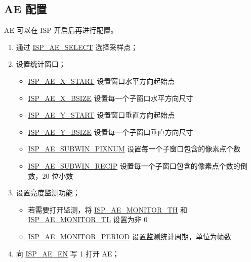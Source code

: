 \documentclass[main\_\_CN.tex]{subfiles}
\begin{document}
\subsection{AE 配置}
AE 可以在 ISP 开启后再进行配置。
\begin{enumerate}
    \item 通过 \hyperref[fielddesc:ISPAESELECT]{ISP\_AE\_SELECT} 选择采样点；

    \item 设置统计窗口；
    \begin{itemize}
        \item \hyperref[fielddesc:ISPAEXSTART]{ISP\_AE\_X\_START} 设置窗口水平方向起始点
        \item \hyperref[fielddesc:ISPAEXBSIZE]{ISP\_AE\_X\_BSIZE} 设置每一个子窗口水平方向尺寸
        \item \hyperref[fielddesc:ISPAEYSTART]{ISP\_AE\_Y\_START} 设置窗口垂直方向起始点
        \item \hyperref[fielddesc:ISPAEYBSIZE]{ISP\_AE\_Y\_BSIZE} 设置每一个子窗口垂直方向尺寸
        \item \hyperref[fielddesc:ISPAESUBWINPIXNUM]{ISP\_AE\_SUBWIN\_PIXNUM} 设置每一个子窗口包含的像素点个数
        \item \hyperref[fielddesc:ISPAESUBWINRECIP]{ISP\_AE\_SUBWIN\_RECIP} 设置每一个子窗口包含的像素点个数的倒数，20 位小数
    \end{itemize}

    \item 设置亮度监测功能；
    \begin{itemize}
        \item 若需要打开监测，将 \hyperref[fielddesc:ISPAEMONITORTH]{ISP\_AE\_MONITOR\_TH} 和 \hyperref[fielddesc:ISPAEMONITORTL]{ISP\_AE\_MONITOR\_TL} 设置为非 0
        \item \hyperref[fielddesc:ISPAEMONITORPERIOD]{ISP\_AE\_MONITOR\_PERIOD} 设置监测统计周期，单位为帧数
    \end{itemize}

    \item 向 \hyperref[fielddesc:ISPAEEN]{ISP\_AE\_EN} 写 1 打开 AE；


\end{enumerate}
\end{document}
